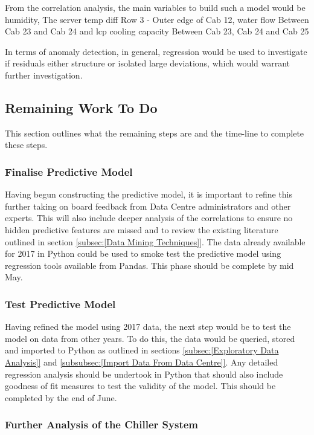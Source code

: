 \documentclass[12pt]{scrartcl}
\begin{document}
From the correlation analysis, the main variables to build such a model would be humidity, The server temp diff Row 3 - Outer edge of Cab 12, water flow Between Cab 23 and Cab 24 and lcp cooling capacity Between Cab 23, Cab 24 and Cab 25

In terms of anomaly detection, in general, regression would be used to investigate if residuals either structure or isolated large deviations, which would warrant further investigation. 

\subsection{Remaining Work To Do}
\label{subsec:[Remaining Work To Do]}
This section outlines what the remaining steps are and the time-line to complete these steps.

\subsubsection{Finalise Predictive Model}
\label{subsubsec:[Finalise Predictive Model]}

Having begun constructing the predictive model, it is important to refine this further taking on board feedback from Data Centre administrators and other experts. This will also include deeper analysis of the correlations to ensure no hidden predictive features are missed and to review the existing literature outlined in section \ref{subsec:[Data Mining Techniques]}. The data already available for 2017 in Python could be used to smoke test the predictive model using regression tools available from Pandas. This phase should be complete by mid May. 

\subsubsection{Test Predictive Model}
\label{subsubsec:[Test Predictive Model]}

Having refined the model using 2017 data, the next step would be to test the model on data from other years. To do this, the data would be queried, stored and imported to Python as outlined in sections \ref{subsec:[Exploratory Data Analysis]} and \ref{subsubsec:[Import Data From Data Centre]}. Any detailed regression analysis should be undertook in Python that should also include goodness of fit measures to test the validity of the model. This should be completed by the end of June.  

\subsubsection{Further Analysis of the Chiller System}
\label{subsubsec:[Further Analysis of the Chiller System]}
\end{document}
